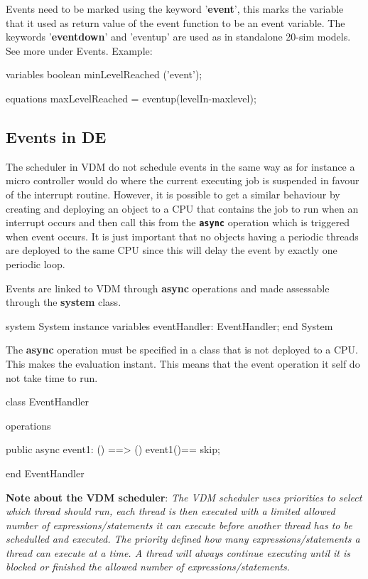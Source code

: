 \documentclass{crescendorepchap}
\newcommand{\vdmkeyw}[1]{{\bf\ttfamily #1}}
\begin{document}
Events need to be marked using the keyword '\vdmkeyw{event}', this marks the
variable that it used as return value of the event function to be an
event variable. The keywords '\vdmkeyw{eventdown}' and 'eventup' are used as in
standalone 20-sim models. See more under Events. Example:

\begin{dcl}
variables
  boolean minLevelReached ('event');

equations
  maxLevelReached = eventup(levelIn-maxlevel);
\end{dcl}

\subsection{Events in DE}

The scheduler in VDM do not schedule events in the same way as for
instance a micro controller would do where the current executing job is
suspended in favour of the interrupt routine. However, it is possible to
get a similar behaviour by creating and deploying an object to a CPU
that contains the job to run when an interrupt occurs and then call this
from the \texttt{\textbf{async}} operation which is triggered when event occurs. It is
just important that no objects having a periodic threads are deployed to
the same CPU since this will delay the event by exactly one periodic
loop.

Events are linked to VDM through \vdmkeyw{async} operations and made assessable
through the \vdmkeyw{system} class.

\begin{vdmrt}
system System
instance variables
  eventHandler: EventHandler;
end System
\end{vdmrt}

The \vdmkeyw{async} operation must be specified in a class that is not deployed to
a CPU. This makes the evaluation instant. This means that the event
operation it self do not take time to run.

\begin{vdmrt}
class EventHandler

operations

public async event1: () ==> ()
event1()== skip;

end EventHandler
\end{vdmrt}

\textbf{Note about the VDM scheduler}: \emph{The VDM scheduler uses
priorities to select which thread should run, each thread is then
executed with a limited allowed number of expressions/statements it can
execute before another thread has to be schedulled and executed. The
priority defined how many expressions/statements a thread can execute
at a time. A thread will always continue executing until it is blocked
or finished the allowed number of expressions/statements.}
\end{document}
